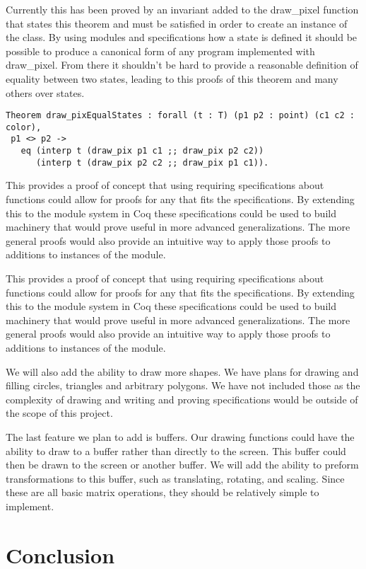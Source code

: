 \documentclass{llncs}
\begin{document}
Currently this has been proved by an invariant added to the draw\_pixel function that states this theorem and must be satisfied in order to create an instance of the class.  By using modules and specifications how a state is defined it should be possible to produce a canonical form of any program implemented with draw\_pixel.  From there it shouldn't be hard to provide a reasonable definition of equality between two states, leading to this proofs of this theorem and many others over states.

\begin{lstlisting}
Theorem draw_pixEqualStates : forall (t : T) (p1 p2 : point) (c1 c2 : color),
 p1 <> p2 -> 
   eq (interp t (draw_pix p1 c1 ;; draw_pix p2 c2))
      (interp t (draw_pix p2 c2 ;; draw_pix p1 c1)).
\end{lstlisting}

This provides a proof of concept that using requiring specifications about functions could allow for proofs for any that fits the specifications.
By extending this to the module system in Coq these specifications could be used to build machinery that would prove useful in more advanced generalizations.  The more general proofs would also provide an intuitive way to apply those proofs to additions to instances of the module.

This provides a proof of concept that using requiring specifications about functions could allow for proofs for any that fits the specifications.
By extending this to the module system in Coq these specifications could be used to build machinery that would prove useful in more advanced generalizations.  The more general proofs would also provide an intuitive way to apply those proofs to additions to instances of the module.

We will also add the ability to draw more shapes. We have plans for drawing and filling circles, triangles and arbitrary polygons. We have not included those as the complexity of drawing and writing and proving specifications would be outside of the scope of this project.

The last feature we plan to add is buffers. Our drawing functions could have the ability to draw to a buffer rather than directly to the screen. This buffer could then be drawn to the screen or another buffer. We will add the ability to preform transformations to this buffer, such as translating, rotating, and scaling. Since these are all basic matrix operations, they should be relatively simple to implement.

\section{Conclusion}






\end{document}
